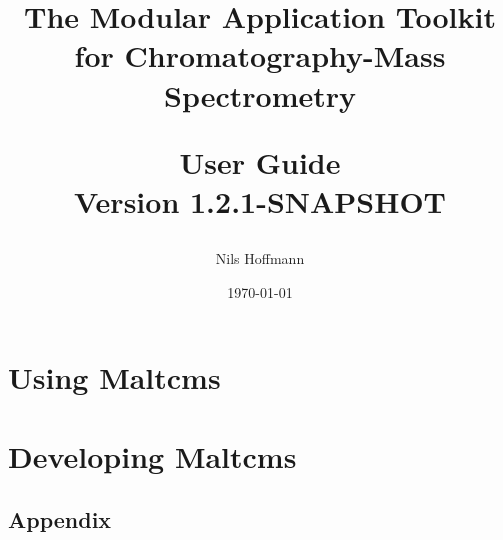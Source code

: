 \documentclass[10pt,a4paper,onecolumn,twoside,titlepage,headsepline,open=any]{scrbook}
\author{Nils Hoffmann}
\title{The Modular Application Toolkit for Chromatography-Mass Spectrometry\\\vspace{1ex}\begin{Large}
User Guide\\
Version 1.2.1-SNAPSHOT
\end{Large}}
\date{\today}
\begin{document}
\frontmatter    %
\maketitle       %





\tableofcontents   %
 
\mainmatter    %

\part{Using Maltcms}


\part{Developing Maltcms}

\backmatter
\chapter{Appendix}
\lstlistoflistings
\printglossaries
\end{document}
